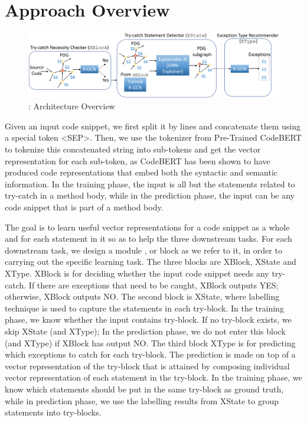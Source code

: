 \section{Approach Overview}
\label{sec:overview}

\begin{figure}[t]
\begin{center}
\includegraphics[width=5.4in]{overview-2.png}
\vspace{-10pt}
\caption{{\tool}: Architecture Overview}
\label{overview}
\end{center}
\end{figure}


Given an input code snippet, we first split it by lines and concatenate them using a special token <SEP>. Then, we use the tokenizer from Pre-Trained CodeBERT to tokenize this concatenated string into sub-tokens and get the vector representation for each sub-token, as CodeBERT has been shown to have produced code representations that embed both the syntactic and semantic information. In the training phase, the input is all but the statements related to try-catch in a method body, while in the prediction phase, the input can be any code snippet that is part of a method body. 

The goal is to learn useful vector representations for a code snippet as a whole and for each statement in it so as to help the three downstream tasks. For each downstream task, we design a module , or block as we refer to it, in order to carrying out the specific learning task. The three blocks are XBlock, XState and XType. XBlock is for deciding whether the input code snippet needs any try-catch. If there are exceptions that need to be caught, XBlock outputs YES; otherwise, XBlock outputs NO. The second block is XState, where labelling technique is used to capture the statements in each try-block. In the training phase, we know whether the input contains try-block. If no try-block exists, we skip XState (and XType); In the prediction phase, we do not enter this block (and XType) if XBlock has output NO. The third block XType is for predicting which exceptions to catch for each try-block. The prediction is made on top of a vector representation of the try-block that is attained by composing individual vector representation of each statement in the try-block. In the training phase, we know which statements should be put in the same try-block as ground truth, while in prediction phase, we use the labelling results from XState to group statements into try-blocks. 


